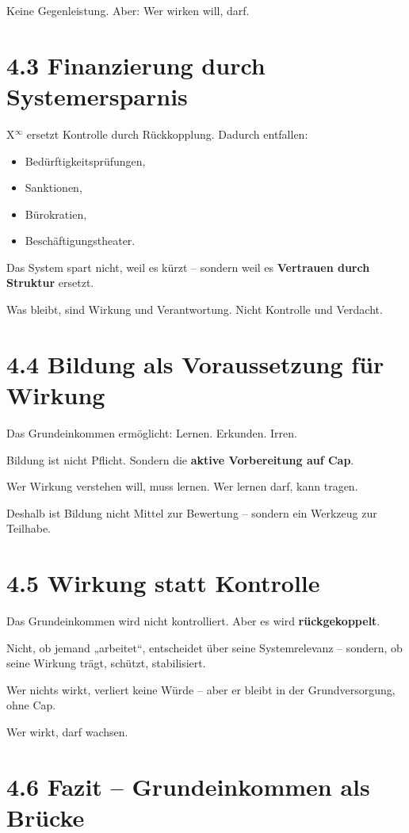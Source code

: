 \documentclass[12pt,a4paper]{book}
\begin{document}
Keine Gegenleistung.  
Aber: Wer wirken will, darf.

\section*{4.3 Finanzierung durch Systemersparnis}

X$^\infty$ ersetzt Kontrolle durch Rückkopplung.  
Dadurch entfallen:

\begin{itemize}
  \item Bedürftigkeitsprüfungen,
  \item Sanktionen,
  \item Bürokratien,
  \item Beschäftigungstheater.
\end{itemize}

Das System spart nicht, weil es kürzt –  
sondern weil es \textbf{Vertrauen durch Struktur} ersetzt.

Was bleibt, sind Wirkung und Verantwortung.  
Nicht Kontrolle und Verdacht.

\section*{4.4 Bildung als Voraussetzung für Wirkung}

Das Grundeinkommen ermöglicht: Lernen. Erkunden. Irren.

Bildung ist nicht Pflicht.  
Sondern die \textbf{aktive Vorbereitung auf Cap}.

Wer Wirkung verstehen will, muss lernen.  
Wer lernen darf, kann tragen.

Deshalb ist Bildung nicht Mittel zur Bewertung –  
sondern ein Werkzeug zur Teilhabe.

\section*{4.5 Wirkung statt Kontrolle}

Das Grundeinkommen wird nicht kontrolliert.  
Aber es wird \textbf{rückgekoppelt}.

Nicht, ob jemand „arbeitet“, entscheidet über seine Systemrelevanz –  
sondern, ob seine Wirkung trägt, schützt, stabilisiert.

Wer nichts wirkt, verliert keine Würde –  
aber er bleibt in der Grundversorgung, ohne Cap.

Wer wirkt, darf wachsen.

\section*{4.6 Fazit – Grundeinkommen als Brücke}
\end{document}
